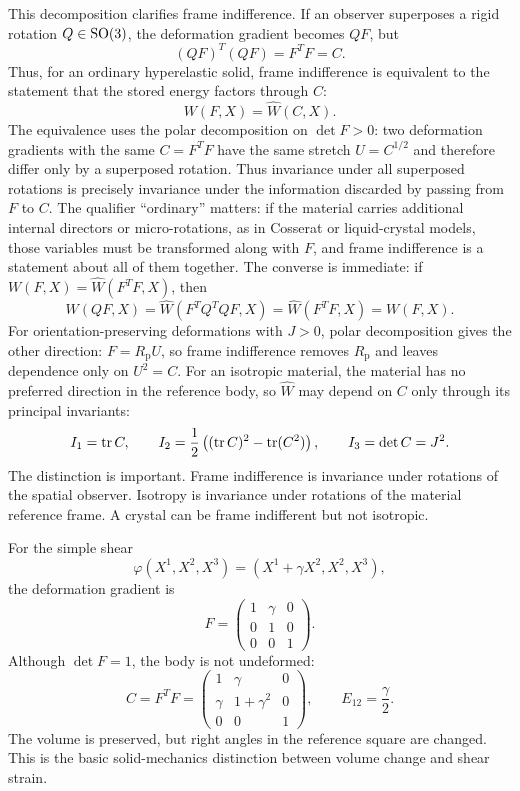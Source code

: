 This decomposition clarifies frame indifference. If an observer superposes a
rigid rotation \(Q\in\operatorname{SO}(3)\), the deformation gradient becomes \(QF\), but
\[
  (QF)^T(QF)=F^TF=C.
\]
Thus, for an ordinary hyperelastic solid, frame indifference is equivalent to
the statement that the stored energy factors through \(C\):
\[
  W(F,X)=\widehat W(C,X).
\]
The equivalence uses the polar decomposition on \(\det F>0\): two deformation
gradients with the same \(C=F^TF\) have the same stretch \(U=C^{1/2}\) and
therefore differ only by a superposed rotation. Thus invariance under all
superposed rotations is precisely invariance under the information discarded by
passing from \(F\) to \(C\).
The qualifier ``ordinary'' matters: if the material carries additional internal
directors or micro-rotations, as in Cosserat or liquid-crystal models, those
variables must be transformed along with \(F\), and frame indifference is a
statement about all of them together.
The converse is immediate: if \(W(F,X)=\widehat W(F^TF,X)\), then
\[
  W(QF,X)=\widehat W(F^TQ^TQF,X)=\widehat W(F^TF,X)=W(F,X).
\]
For orientation-preserving deformations with \(J>0\), polar decomposition gives
the other direction: \(F=R_{\mathrm p}U\), so frame indifference removes
\(R_{\mathrm p}\) and leaves dependence only on \(U^2=C\).
For an isotropic material, the material has no preferred direction in the
reference body, so \(\widehat W\) may depend on \(C\) only through its principal
invariants:
\[
  I_1=\operatorname{tr} C,\qquad
  I_2=\frac12\left((\operatorname{tr} C)^2-\operatorname{tr}(C^2)\right),\qquad
  I_3=\det C=J^2.
\]
The distinction is important. Frame indifference is invariance under rotations
of the spatial observer. Isotropy is invariance under rotations of the
material reference frame. A crystal can be frame indifferent but not isotropic.

\begin{example}
For the simple shear
\[
  \varphi(X^1,X^2,X^3)=(X^1+\gamma X^2,X^2,X^3),
\]
the deformation gradient is
\[
  F=
  \begin{pmatrix}
  1&\gamma&0\\
  0&1&0\\
  0&0&1
  \end{pmatrix}.
\]
Although \(\det F=1\), the body is not undeformed:
\[
  C=F^TF=
  \begin{pmatrix}
  1&\gamma&0\\
  \gamma&1+\gamma^2&0\\
  0&0&1
  \end{pmatrix},
  \qquad
  E_{12}=\frac{\gamma}{2}.
\]
The volume is preserved, but right angles in the reference square are changed.
This is the basic solid-mechanics distinction between volume change and shear
strain.
\end{example}

